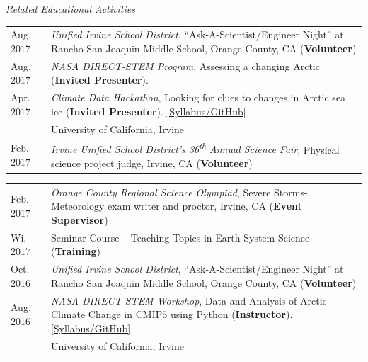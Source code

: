 \documentclass[margin,line,palatino,courier,10pt]{res}
\begin{document}
\begin{resume}
\textit{Related Educational Activities}
\vspace*{0.05in}\\
\begin{tabular}{@{}p{0.8in}p{4in}}
Aug. $2017$ & \textit{Unified Irvine School District}, ``Ask-A-Scientist/Engineer Night'' at Rancho San Joaquin Middle School, Orange County, CA (\textbf{Volunteer})\\
Aug. $2017$ & \textit{NASA DIRECT-STEM Program}, Assessing a changing Arctic (\textbf{Invited Presenter}).\\
Apr. $2017$ & \textit{Climate Data Hackathon}, Looking for clues to changes in Arctic 
sea ice (\textbf{Invited Presenter}). \href{https://github.com/UCIDataScienceInitiative/Climate_Hackathon}{[Syllabus/GitHub]}\\
& University of California, Irvine\\
Feb. $2017$ & \textit{Irvine Unified School District's 36\textsuperscript{th} Annual Science Fair}, Physical science project judge, Irvine, CA (\textbf{Volunteer})\\
\end{tabular}
\begin{tabular}{@{}p{0.8in}p{4in}}
Feb. $2017$ & \textit{Orange County Regional Science Olympiad}, Severe Storms-Meteorology exam writer and proctor, Irvine, CA (\textbf{Event Supervisor})\\
Wi. $2017$ & Seminar Course -- Teaching Topics in Earth System Science (\textbf{Training})\\
Oct. $2016$ & \textit{Unified Irvine School District}, ``Ask-A-Scientist/Engineer Night'' at Rancho San Joaquin Middle School, Orange County, CA (\textbf{Volunteer})\\
Aug. $2016$ & \textit{NASA DIRECT-STEM Workshop}, Data and Analysis of Arctic Climate Change in CMIP$5$ using Python (\textbf{Instructor}). \href{https://github.com/strongh/DIRECT-STEM-climate-workshop}{[Syllabus/GitHub]}\\
& University of California, Irvine\\
\end{tabular}

\vspace{-0.1in}
\noindent\makebox[\linewidth][r]{\rule{\textwidth}{5pt}}

\end{resume}
\end{document}
